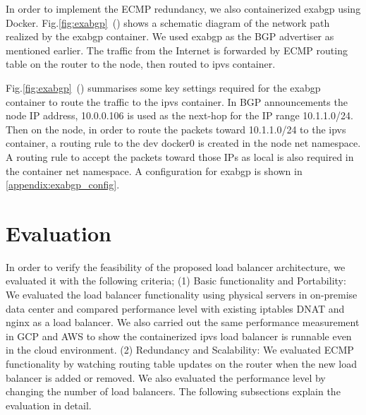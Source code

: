 In order to implement the ECMP redundancy, we also containerized exabgp using Docker.
Fig.\ref{fig:exabgp}~() shows a schematic diagram of the network path realized by the exabgp container.
We used exabgp as the BGP advertiser as mentioned earlier.
The traffic from the Internet is forwarded by ECMP routing table on the router to the node, then routed to ipvs container.

Fig.\ref{fig:exabgp}~() summarises some key settings required for the exabgp container to route the traffic to the ipvs container.
In BGP announcements the node IP address, 10.0.0.106 is used as the next-hop for the IP range 10.1.1.0/24.
Then on the node, in order to route the packets toward 10.1.1.0/24 to the ipvs container, 
a routing rule to the dev docker0 is created in the node net namespace. 
A routing rule to accept the packets toward those IPs as local is also required in the container net namespace. 
A configuration for exabgp is shown in \ref{appendix:exabgp_config}.


\section{Evaluation}\label{Evaluation}

In order to verify the feasibility of the proposed load balancer architecture, we evaluated it with the following criteria;
(1) Basic functionality and Portability:
We evaluated the load balancer functionality using physical servers in on-premise data center and compared performance level with existing iptables DNAT and nginx as a load balancer.
We also carried out the same performance measurement in GCP and AWS to show the containerized ipvs load balancer is runnable even in the cloud environment.
(2) Redundancy and Scalability:
We evaluated ECMP functionality by watching routing table updates on the router when the new load balancer is added or removed.
We also evaluated the performance level by changing the number of load balancers.
%
The following subsections explain the evaluation in detail.



